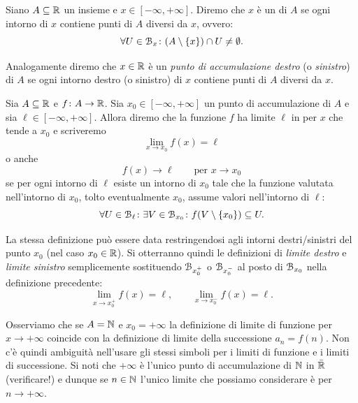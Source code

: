 \begin{definition}
\mymark{*}
Siano $A\subseteq  \mathbb R$ un insieme e $x\in [-\infty, +\infty]$.
Diremo che $x$ è un  di $A$
se ogni intorno di $x$ contiene punti di $A$ diversi da $x$, ovvero:
\[
 \forall U \in \mathcal B_x\colon (A\setminus {\left\{ x \right\}}) \cap U \neq \emptyset.
\]

Analogamente diremo che $x\in \mathbb R$
è un \emph{punto di accumulazione destro}
(o \emph{sinistro}) di $A$ se ogni intorno destro (o sinistro) di
$x$ contiene punti di $A$ diversi da $x$.
\end{definition}

\begin{definition}
\mymark{***}
Sia $A\subseteq \mathbb R$ e $f\colon A \to \mathbb R$. Sia $x_0\in [-\infty,+\infty]$
un punto di accumulazione
di $A$ e sia $\ell \in [-\infty,+\infty]$.
Allora diremo che la funzione $f$ ha limite $\ell$ in per $x$ che tende a $x_0$ e scriveremo
\[
  \lim_{x\to x_0} f(x) = \ell
\]
o anche
\[
  f(x) \to \ell \qquad \text{per $x\to x_0$}
\]
se per ogni intorno di $\ell$ esiste un intorno di $x_0$ tale che
la funzione valutata nell'intorno di $x_0$, tolto eventualmente $x_0$,
assume valori
nell'intorno di $\ell$:
\begin{equation}\label{eq:def_limite}
  \forall U \in \mathcal B_\ell \colon \exists V \in \mathcal B_{x_0} \colon f(V\setminus{\left\{ x_0 \right\}}) \subseteq U.
\end{equation}

La stessa definizione può essere data restringendosi agli intorni destri/sinistri del punto $x_0$ (nel caso $x_0 \in \mathbb R$). Si otterranno quindi le definizioni
di \emph{limite destro} e \emph{limite sinistro}
semplicemente
sostituendo $\mathcal B_{x_0^+}$ o $\mathcal B_{x_0^-}$ al posto di $\mathcal B_{x_0}$ nella definizione
precedente:
\[
  \lim_{x\to x_0^+}f(x) = \ell, \qquad \lim_{x\to x_0^-} f(x) = \ell.
\]
\end{definition}

Osserviamo che se $A=\mathbb N$ e $x_0=+\infty$ la definizione di limite di funzione
per $x\to +\infty$ coincide con la definizione di limite della successione $a_n = f(n)$.
Non c'è quindi ambiguità nell'usare gli stessi simboli per i limiti di funzione e i limiti di successione.
Si noti che $+\infty$ è l'unico punto di accumulazione di $\mathbb N$ in $\bar {\mathbb R}$ (verificare!) e dunque se $n\in \mathbb N$ l'unico limite che possiamo considerare è per $n\to +\infty$.

